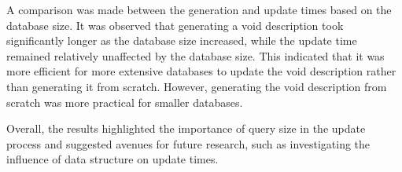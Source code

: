 A comparison was made between the generation and update times based on the database size. It was observed that generating a \gls{void} description took significantly longer as the database size increased, while the update time remained relatively unaffected by the database size. This indicated that it was more efficient for more extensive databases to update the \gls{void} description rather than generating it from scratch. However, generating the \gls{void} description from scratch was more practical for smaller databases.

Overall, the results highlighted the importance of query size in the update process and suggested avenues for future research, such as investigating the influence of data structure on update times.
